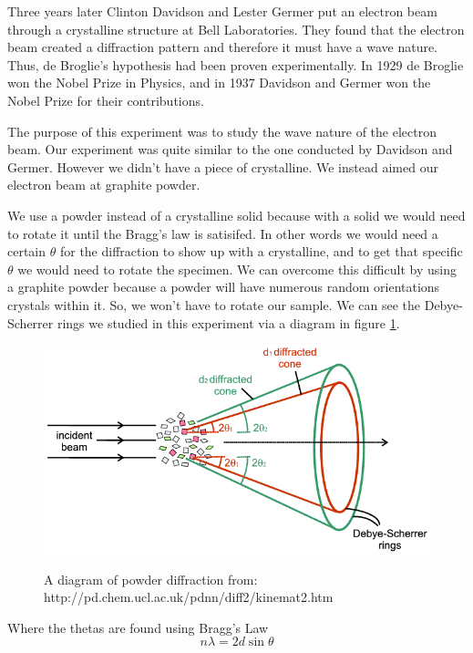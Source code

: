 \documentclass[12pt letterpaper]{article}
\begin{document}
Three years later Clinton Davidson and Lester Germer put an electron beam through a crystalline structure at Bell Laboratories. They found that the electron beam created a diffraction pattern and therefore it must have a wave nature. Thus, de Broglie's hypothesis had been proven experimentally. In 1929 de Broglie won the Nobel Prize in Physics, and in 1937 Davidson and Germer won the Nobel Prize for their contributions. 


The purpose of this experiment was to study the wave nature of the electron beam. Our experiment was quite similar to the one conducted by Davidson and Germer. However we didn't have a piece of crystalline. We instead aimed our electron beam at graphite powder. 

We use a powder instead of a crystalline solid because with a solid we would need to rotate it until the Bragg's law is satisifed. In other words we would need a certain $\theta$ for the diffraction to show up with a crystalline, and to get that specific $\theta$ we would need to rotate the specimen. We can overcome this difficult by using a graphite powder because a powder will have numerous random orientations crystals within it. So, we won't have to rotate our sample.  We can see the Debye-Scherrer rings we studied in this experiment via a diagram in figure \ref{fig:debye_scherrer}.


\begin{figure}[H]
  \caption{A diagram of powder diffraction from: http://pd.chem.ucl.ac.uk/pdnn/diff2/kinemat2.htm }
  \centering
    \includegraphics[width=\textwidth]{cone.png}
    \label{fig:debye_scherrer}
\end{figure}

Where the thetas are found using Bragg's Law 
\begin{equation}
\label{eq:bragg}
n \lambda = 2 d \sin \theta
\end{equation}
\end{document}
